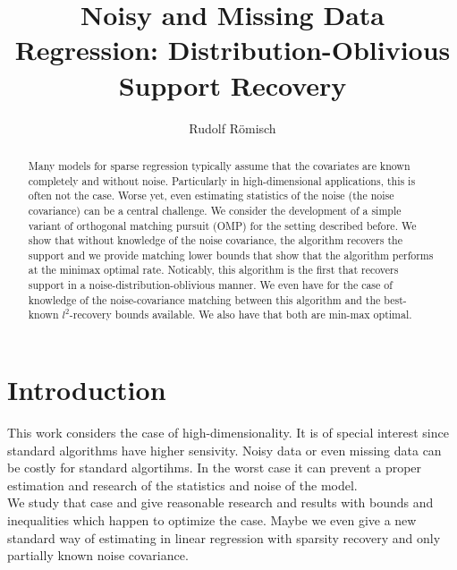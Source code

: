 \documentclass[a4paper,10pt]{article}
\author{Rudolf Römisch}
\title{Noisy and Missing Data Regression: Distribution-Oblivious Support Recovery}
\theoremstyle{definition}
\begin{document}
\maketitle

\vskip 0.3in

\begin{abstract}
Many models for sparse regression typically assume that the covariates are known completely and without noise. Particularly in high-dimensional applications, this is often not the case. Worse yet, even estimating statistics of the noise (the noise covariance) can be a central challenge.  
We consider the development of a simple variant of orthogonal matching pursuit (OMP) for the setting described before. We show that without knowledge of the noise covariance, the algorithm recovers the support and we provide matching lower bounds that show that the algorithm performs at the minimax optimal rate. Noticably, this algorithm is the first that recovers support in a noise-distribution-oblivious manner. We even have for the case of knowledge of the noise-covariance matching between this algorithm and the best-known $l^2$-recovery bounds available. We also have that both are min-max optimal.
\end{abstract}

\section{Introduction}


This work considers the case of high-dimensionality. It is of special interest since standard algorithms have higher sensivity. Noisy data or even missing data can be costly for standard algortihms. In the worst case it can prevent a proper estimation and research of the statistics and noise of the model. \\
We study that case and give reasonable research and results with bounds and inequalities which happen to optimize the case. Maybe we even give a new standard way of estimating in linear regression with sparsity recovery and only partially known noise covariance.
\end{document}
